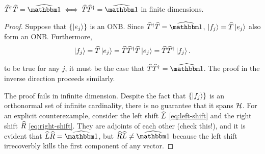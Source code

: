 \begin{lemma}\label{}
    $\op T\dgg \op T = \op\id \iff \op T\op T\dgg = \op\id$ in finite dimensions.
\end{lemma}

\begin{proof}
    Suppose that $\{\ket{e_j}\}$ is an ONB. Since $\op T\dgg\op T=\op\id$, $\ket{f_j} = \widehat{T}\ket{e_j}$ also form an ONB. Furthermore,
    \begin{align}
        \ket{f_j} = \widehat{T}\ket{e_j} = \widehat{T} \widehat{T}^{\dagger} \widehat{T}\ket{e_j} = \widehat{T}\widehat{T}^{\dagger} \ket{f_j}.
    \end{align}
    
    to be true for any $j$, it must be the case that $\op T \op T\dgg=\op\id$. The proof in the inverse direction proceeds similarly.

    The proof fails in infinite dimension. Despite the fact that $\{\ket{f_j}\}$ is an orthonormal set of infinite cardinality, there is no guarantee that it spans $\mathcal{H}$. For an explicit counterexample, consider the left shift $\widehat{L}$ \eqref{eq:left-shift} and the right shift $\widehat{R}$ \eqref{eq:right-shift}. They are adjoints of each other (check this!), and it is evident that $\op L\op R =\op\id$, but $\op R\op L\neq \op\id$ because the left shift irrecoverbly kills the first component of any vector.
\end{proof}



